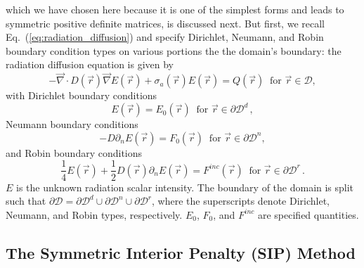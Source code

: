\documentclass[preprint,10pt]{elsarticle}
\renewcommand{\div}{\vec{\nabla}\! \cdot \!}
\newcommand{\grad}{\vec{\nabla}}
\newcommand{\D}{\mathcal{D}}
\newcommand{\vr}{\vec{r}}
\newcommand{\eqt}[1]{Eq.~(\ref{#1})}                     %
\begin{document}
which we have chosen here because it is one of the simplest forms and leads to symmetric 
positive definite matrices, is discussed next. 
%
But first, we recall \eqt{eq:radiation_diffusion} and specify 
Dirichlet, Neumann, and Robin boundary condition types on various portions the the domain's
boundary: the radiation diffusion equation is given by
\begin{equation}
  -\div D(\vr) \grad E(\vr) + \sigma_a(\vr) E(\vr) = Q(\vr)\ \textrm{ for } \vr \in \D,
\end{equation}
with Dirichlet boundary conditions
\begin{equation}
  E(\vr)  = E_0(\vr)\ \textrm{ for } \vr \in  \partial \D^d \, ,
\end{equation}
Neumann boundary conditions
\begin{equation}
  -D \partial_n E(\vr) = F_0(\vr) \ \textrm{ for } \vr \in \partial \D^n,
\end{equation}
and Robin boundary conditions
\begin{equation}
  \frac{1}{4}E(\vr) + \frac{1}{2} D(\vr) \partial_n E(\vr) = F^{inc}(\vr) \ \textrm{ for } \vr \in  \partial \D^r \, .
\end{equation}
%
$E$ is the unknown radiation scalar intensity. The boundary of the domain is split such that
$\partial \D = \partial \D^d \cup \partial \D^n \cup \partial \D^r$,  where the superscripts
denote Dirichlet, Neumann, and Robin types, respectively. $E_0$, $F_0$, and $F^{inc}$ are specified
quantities. 


\subsection{The Symmetric Interior Penalty (SIP) Method}
\end{document}
